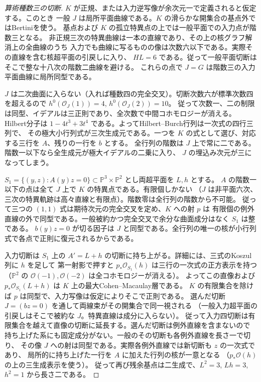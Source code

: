 \begin{proof}[算術種数三の切断]
$K$ が正規、または入力逆写像が余次元一で定義されると仮定する。このとき
一般 $J$ は局所平面曲線である。$K$ の滑らかな開集合の基点外ではBertiniを使う。
基点および $K$ の孤立特異点の上では一般平面での入力点が階数三となる。
非正規三次の特異曲線は一本の直線であり、その上の核グラフ解消上の全曲線のうち
入力でも曲線に写るものの像は次数六以下である。実際その直線を含む核超平面の引戻しに入り、
$HL=6$ である。従って一般平面切断はそこで整な十八次の階数二曲線を避ける。
これらの点で $J=G$ は階数三の入力平面曲線に局所同型である。

$J$ は二次曲面に入らない（入れば種数四の完全交叉）。切断次数六が標準次数四を超えるので
$h^0(\mathcal O_J(1))=4$, $h^0(\mathcal O_J(2))=10$。
従って次数一、二の制限は同型、イデアルは三正則であり、全次数で中間コホモロジーが消える。
Hilbert分子は $1-4t^3+3t^4$ である。よってHilbert--Burch行列は一次式の四行三列で、
その極大小行列式が三次生成元である。一つを $K$ の式として選び、対応する三行を $A$、残りの一行を $b$ とする。
全行列の階数は $J$ 上で常に二である。階数一以下なら全生成元が極大イデアルの二乗に入り、
$J$ の埋込み次元が三になってしまう。

$S_1=\{(y,z):A(y)z=0\}\subset\mathbb P^3\times\mathbb P^2$ とし両超平面を $L,h$ とする。
$A$ の階数一以下の点は全て $J$ 上で $K$ の特異点である。有限個しかない
（$J$ は非平面六次、三次の特異軌跡は高々直線と有限点）。階数零は全行列の階数から不可能。
従って三つの $(1,1)$ 式は期待次元の完全交叉を定め、$K$ への射 $p$ は
有限個の例外直線の外で同型である。一般被約かつ完全交叉で余分な曲面成分はなく $S_1$ は整である。
$b(y)z=0$ が切る因子は $J$ と同型である。全行列の唯一の核が小行列式で各点で正則に復元されるからである。

入力切断は $S_1$ 上の $A'=L+h$ の切断に持ち上がる。詳細には、三式のKoszul列に $h$ を足して
第一射影で押すと $p_*\mathcal O_{S_1}(h)$ は三行の一次式の正方表示を持つ
（$\mathbb P^2$ の $\mathcal O(-1),\mathcal O(-2)$ は全コホモロジーが消える）。
よってこの直像および $p_*\mathcal O_{S_1}(L+h)$ は $K$ 上の最大Cohen--Macaulay層である。
$K$ の有限集合を除けば $p$ は同型で、入力写像は仮定によりそこで正則である。
選んだ切断 $J=(bz=0)$ を通して両線束がその開集合で同一視される
（一般入力超平面の引戻しはそこで被約な $J$。特異直線は成分に入らない）。
従って入力四切断は有限集合を越えて直像の切断に延長する。選んだ切断は例外直線を含まないので
持ち上げた系にも固定成分がない。一般のその切断も各例外直線を長さ一で切り、
その像 $J$ への射は同型である。実際各例外直線では新切断も $z$ の一次式であり、
局所的に持ち上げた一行を $A$ に加えた行列の核が一意となる
（$p_*\mathcal O(h)$ の上の三生成表示を使う）。
従って再び残余基点は二生成で、$L^2=3$, $Lh=3$, $h^2=1$ から長さ二である。


\end{proof}

